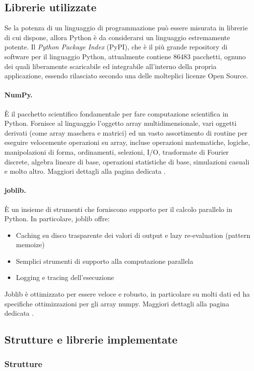 \subsection{Librerie utilizzate}
Se la potenza di un linguaggio di programmazione può essere misurata in librerie di cui dispone, allora Python è da considerarsi un linguaggio estremamente potente. Il \textit{Python Package Index} (PyPI), che è il più grande repository di software per il linguaggio Python, attualmente contiene 86483 pacchetti, ognuno dei quali liberamente scaricabile ed integrabile all'interno della propria applicazione, essendo rilasciato secondo una delle molteplici licenze Open Source.
\paragraph{NumPy.} È il pacchetto scientifico fondamentale per fare computazione scientifica in Python. Fornisce al linguaggio l'oggetto array multidimensionale, vari oggetti derivati (come array maschera e matrici) ed un vasto assortimento di routine per eseguire velocemente operazioni su array, incluse operazioni matematiche, logiche, manipolazioni di forma, ordinamenti, selezioni, I/O, trasformate di Fourier discrete, algebra lineare di base, operazioni statistiche di base, simulazioni casuali e molto altro. Maggiori dettagli alla pagina dedicata \cite{Numpy}.
\paragraph{joblib.} È un insieme di strumenti che forniscono supporto per il calcolo parallelo in Python. In particolare, joblib offre:
\begin{itemize}
	\item Caching su disco trasparente dei valori di output e lazy re-evaluation (pattern memoize)
	\item Semplici strumenti di supporto alla computazione parallela
	\item Logging e tracing dell'esecuzione
\end{itemize}
Joblib è ottimizzato per essere veloce e robusto, in particolare su molti dati ed ha specifiche ottimizzazioni per gli array numpy. Maggiori dettagli alla pagina dedicata \cite{joblib}.
\subsection{Strutture e librerie implementate}
\subsubsection{Strutture}
